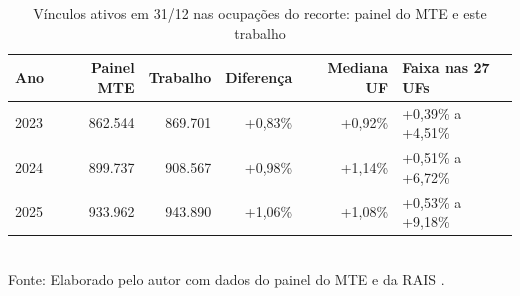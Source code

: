 \begin{table}[htbp]
    \centering
    \caption{Vínculos ativos em 31/12 nas ocupações do recorte: painel do MTE e este trabalho}
    \label{tab:validacao-rais}
    \footnotesize
    \renewcommand{\arraystretch}{1.25}
    \begin{tabular}{lrrrrl}
        \toprule
        \rowcolor{black!8}
        \textbf{Ano} & \textbf{Painel MTE} & \textbf{Trabalho} & \textbf{Diferença} & \textbf{Mediana UF} & \textbf{Faixa nas 27 UFs} \\
        \midrule
        2023 & 862.544 & 869.701 & +0,83\% & +0,92\% & +0,39\% a +4,51\% \\
        2024 & 899.737 & 908.567 & +0,98\% & +1,14\% & +0,51\% a +6,72\% \\
        2025 & 933.962 & 943.890 & +1,06\% & +1,08\% & +0,53\% a +9,18\% \\
        \bottomrule
    \end{tabular}
    \\[4pt]
    Fonte: Elaborado pelo autor com dados do painel do MTE \cite{PainelMTE2026} e da RAIS \cite{RAIS2024}.
\end{table}
